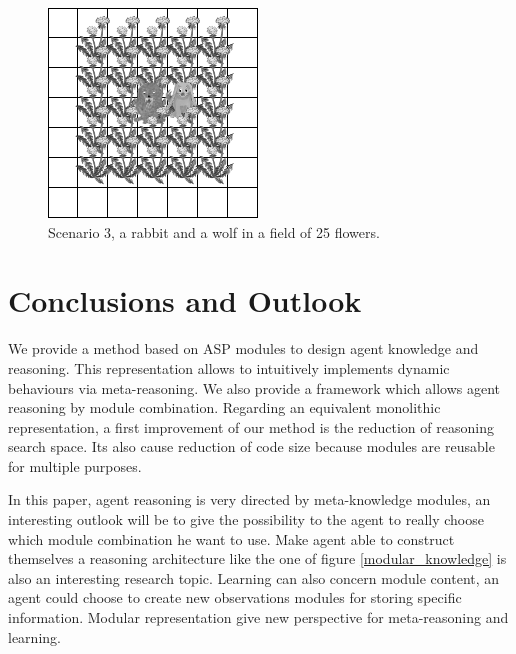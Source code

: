 \documentclass{aamas2012}
\begin{document}
	\begin{figure}
		\centering
		\includegraphics[keepaspectratio=true, scale=0.5]{scenario_3.png}
		\caption
		{
			\label{scenario_3}
			Scenario 3, a rabbit and a wolf in a field of 25 flowers.
		}
	\end{figure}

\section{Conclusions and Outlook}

	We provide a method based on ASP modules to design agent knowledge and reasoning.
	This representation allows to intuitively implements dynamic behaviours via meta-reasoning.
	We also provide a framework which allows agent reasoning by module combination.
	Regarding an equivalent monolithic representation, a first improvement of our method is the reduction of reasoning search space.
	Its also cause reduction of code size because modules are reusable for multiple purposes.
	
	In this paper, agent reasoning is very directed by meta-knowledge modules, 
	an interesting outlook will be to give the possibility to the agent to really choose which module combination he want to use.
	Make agent able to construct themselves a reasoning architecture like the one of figure \ref{modular_knowledge} is also an interesting research topic.
	Learning can also concern module content, an agent could choose to create new observations modules for storing specific information.
	Modular representation give new perspective for meta-reasoning and learning.
%

%
%

\nocite{*}
\end{document}
